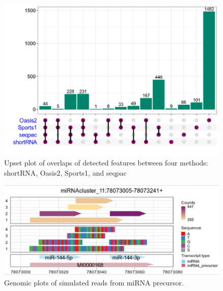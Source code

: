 \documentclass[12pt,twoside]{reedthesis}
\begin{document}
\begin{figure}[h]

{\centering \includegraphics{thesis_files/figure-latex/3f14-1} 

}

\caption{Upset plot of overlaps of detected features between four methods: shortRNA, Oasis2, Sports1, and seqpac}\label{fig:3f14}
\end{figure}

\begin{figure}[h]

{\centering \includegraphics{thesis_files/figure-latex/3f15-1} 

}

\caption{Genomic plots of simulated reads from miRNA precursor.}\label{fig:3f15}
\end{figure}
\end{document}
